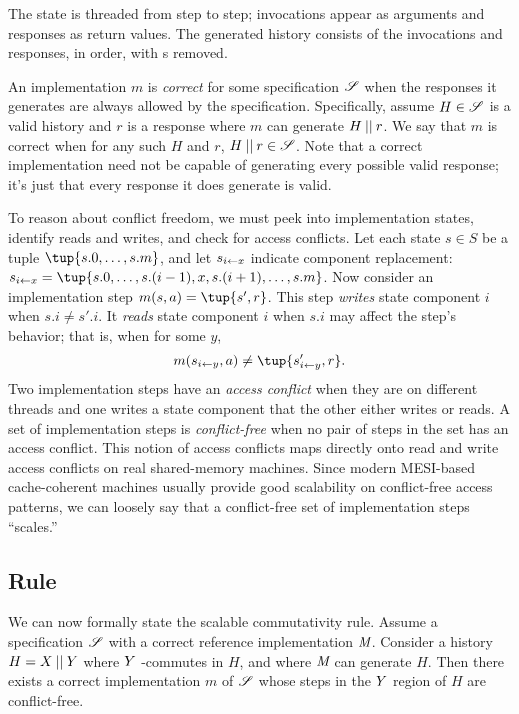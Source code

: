 \noindent The state is threaded from step to step;
invocations appear as arguments and responses as
return values. The generated history consists of the invocations
and responses, in order, with \CONTINUE{}s removed.

An implementation $m$ is \emph{correct} for some specification $\mathscr{S}$
when the responses it generates are always allowed by the specification.
Specifically, assume $H \in \mathscr{S}$ is a valid history and
$r$ is a response where $m$ can generate $H \mathbin{||} r$.
We say that $m$ is correct when for any such $H$ and $r$, $H
\mathbin{||} r \in \mathscr{S}$. Note that a correct implementation need not be
capable of generating
every possible valid response; it's just that every response it does
generate is valid.

To reason about conflict freedom, we must peek into
implementation states, identify reads and writes, and check for access
conflicts.
%
Let each state $s \in S$ be a tuple $\tup{s.0, \dots, s.m}$, and let
%
$s_{i\gets x}$ indicate component
replacement: $\tupleadj{s}{i}{x} = \tup{s.0,\dots,s.(i-1),x,s.(i+1),\dots,s.m}$.
%
Now consider an implementation step $m(s,a) = \tup{s', r}$.
%
This step \emph{writes} state component $i$
when $s.i \neq s'.i$.
%
It \emph{reads} state component $i$ when $s.i$ may affect the
step's behavior; that is, when for some $y$,
%
\[m(\tupleadj{s}{i}{y},a) \neq \tup{\tupleadj{s'}{i}{y}, r}.\]
%
Two implementation steps have an \emph{access conflict} when they are on
different threads and one writes a state component that the other either
writes or reads.
%
A set of implementation steps is \emph{conflict-free}
when no pair of steps in the set has an access conflict.
%
This notion of access conflicts maps directly onto read and write access
conflicts on real shared-memory machines. Since modern MESI-based
cache-coherent machines
usually provide good scalability on conflict-free access patterns,
we can loosely say that a conflict-free set of implementation steps
``scales.''


\subsection{Rule}

We can now formally state the scalable commutativity rule.
%
Assume a specification $\mathscr{S}$ with a correct reference implementation
$\textit{M}$.
%
Consider a history $H = X \mathbin{||} Y$ where $Y$ \SIM-commutes in $H$,
and where $\textit{M}$ can generate $H$.
%
Then there exists a correct implementation $m$ of $\mathscr{S}$ whose steps in
the $Y$ region of $H$ are conflict-free.

